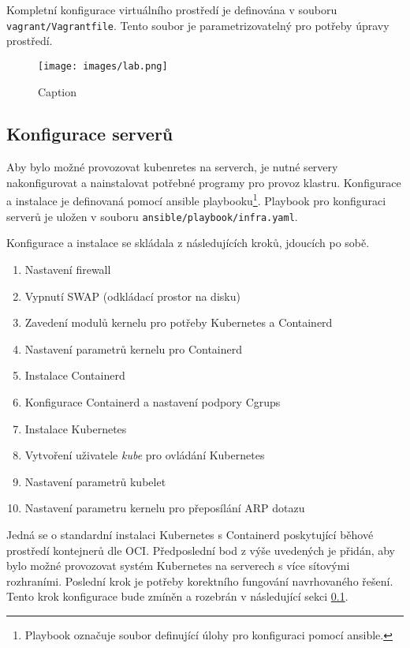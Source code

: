 Kompletní konfigurace virtuálního prostředí je definována v souboru \verb|vagrant/Vagrantfile|. Tento soubor je parametrizovatelný pro potřeby úpravy prostředí. 
\begin{figure}[ht]
    \centering
    \texttt{[image: images/lab.png]}
    \caption{Caption}
    \label{fig:lab}
\end{figure}

\subsection{Konfigurace serverů}
Aby bylo možné provozovat kubenretes na serverch, je nutné servery nakonfigurovat a nainstalovat potřebné programy pro provoz klastru. Konfigurace a instalace je definovaná pomocí ansible playbooku\footnote{Playbook označuje soubor definující úlohy pro konfiguraci pomocí ansible.}. Playbook pro konfiguraci serverů je uložen v souboru \verb|ansible/playbook/infra.yaml|.

Konfigurace a instalace se skládala z následujících kroků, jdoucích po sobě.
\begin{enumerate}
    \item Nastavení firewall
    \item Vypnutí SWAP (odkládací prostor na disku)
    \item Zavedení modulů kernelu pro potřeby Kubernetes a Containerd
    \item Nastavení parametrů kernelu pro Containerd
    \item Instalace Containerd
    \item Konfigurace Containerd a nastavení podpory Cgrups
    \item Instalace Kubernetes
    \item Vytvoření uživatele \textit{kube} pro ovládání Kubernetes
    \item Nastavení parametrů kubelet\label{en:ip_set}
    \item Nastavení parametru kernelu pro přeposílání ARP dotazu\label{en:arp_forward}
\end{enumerate}
Jedná se o standardní instalaci Kubernetes s Containerd poskytující běhové prostředí kontejnerů dle OCI. Předposlední bod z výše uvedených je přidán, aby bylo možné provozovat systém Kubernetes na serverech s více sítovými rozhraními. Poslední krok \label{en:arp_forward} je potřeby korektního fungování navrhovaného řešení. Tento krok konfigurace bude zmíněn a rozebrán v následující sekci \ref{}.


